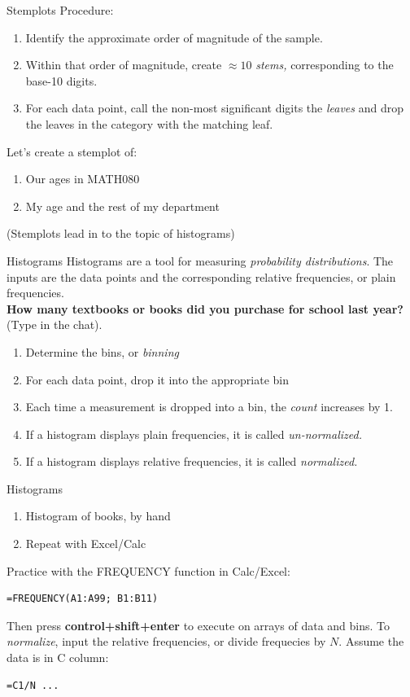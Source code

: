 \documentclass{beamer}
\begin{document}
\begin{frame}[fragile]{Stemplots}
\small
Procedure:
\begin{enumerate}
\item Identify the approximate order of magnitude of the sample.
\item Within that order of magnitude, create $\approx 10$ \textit{stems,} corresponding to the base-10 digits.
\item For each data point, call the non-most significant digits the \textit{leaves} and drop the leaves in the category with the matching leaf.
\end{enumerate}
Let's create a stemplot of:
\begin{enumerate}
\item Our ages in MATH080
\item My age and the rest of my department
\end{enumerate}
(Stemplots lead in to the topic of histograms)
\end{frame}

\begin{frame}[fragile]{Histograms}
\alert{Histograms} are a tool for measuring \textit{probability distributions}.  The inputs are the data points and the corresponding relative frequencies, or plain frequencies. \\ \vspace{0.5cm}
\textbf{How many textbooks or books did you purchase for school last year?} (Type in the chat).
\begin{enumerate}
\item Determine the bins, or \textit{binning}
\item For each data point, drop it into the appropriate bin
\item Each time a measurement is dropped into a bin, the \textit{count} increases by 1.
\item If a histogram displays plain frequencies, it is called \textit{un-normalized.}
\item If a histogram displays relative frequencies, it is called \textit{normalized.}
\end{enumerate}
\end{frame}

\begin{frame}[fragile]{Histograms}
\begin{enumerate}
\item Histogram of books, by hand
\item Repeat with Excel/Calc
\end{enumerate}
Practice with the FREQUENCY function in Calc/Excel:
\begin{verbatim}
=FREQUENCY(A1:A99; B1:B11)
\end{verbatim}
Then press \alert{\textbf{control+shift+enter}} to execute on arrays of data and bins.  To \textit{normalize}, input the relative frequencies, or divide frequecies by $N$.  Assume the data is in C column:
\begin{verbatim}
=C1/N ...
\end{verbatim}
\end{frame}
\end{document}
